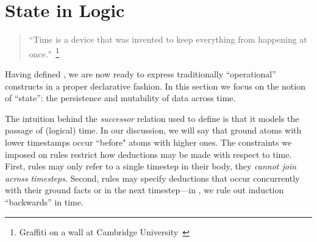 \section{State in Logic}





\begin{quote}
``Time is a device that was invented to keep everything from happening at once."~\footnote{Graffiti on a wall at Cambridge University~\cite{scheme}}
\end{quote}
Having defined \slang, we are now ready to express traditionally ``operational'' constructs in a proper declarative fashion.  In this section we focus on the notion of ``state'': the persistence and mutability of data across time.

The intuition behind the \emph{successor} relation used to define \slang is that it models the
passage of (logical) time.  In our discussion, we will say that ground atoms with lower timestamps
occur ``before" atoms with higher ones.
The constraints we imposed on \slang rules restrict how deductions may be made
with respect to time.  First, rules may only refer to a single timestep in
their body, they {\em cannot join across timesteps}.  Second, rules may specify
deductions that occur concurrently with their ground facts or in the next
timestep---in \slang, we rule out induction ``backwards'' in time.

